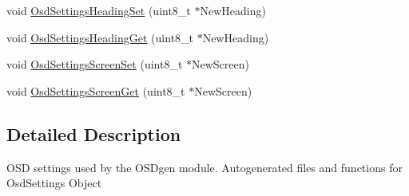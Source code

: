 \begin{DoxyCompactItemize}
\item 
void \hyperlink{group___osd_settings_ga6a17fd8ccededb7cc2bcd97fb29c6870}{\-Osd\-Settings\-Heading\-Set} (uint8\-\_\-t $\ast$\-New\-Heading)
\item 
void \hyperlink{group___osd_settings_ga3c5b2d1a035c06536a808f63f73582be}{\-Osd\-Settings\-Heading\-Get} (uint8\-\_\-t $\ast$\-New\-Heading)
\item 
void \hyperlink{group___osd_settings_ga29e025416e16251aca0f537e54ed5e85}{\-Osd\-Settings\-Screen\-Set} (uint8\-\_\-t $\ast$\-New\-Screen)
\item 
void \hyperlink{group___osd_settings_gad076da7ac3e75186821938d3b00c7a19}{\-Osd\-Settings\-Screen\-Get} (uint8\-\_\-t $\ast$\-New\-Screen)
\end{DoxyCompactItemize}


\subsection{\-Detailed \-Description}
\-O\-S\-D settings used by the \-O\-S\-Dgen module. \-Autogenerated files and functions for \-Osd\-Settings \-Object 

